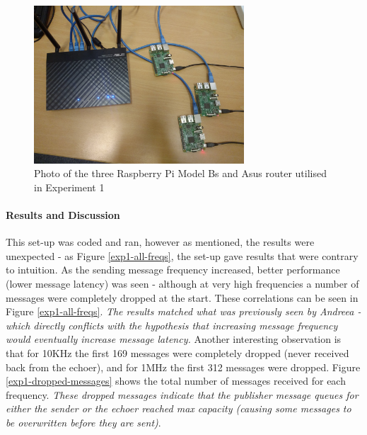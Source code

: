 \documentclass[../dissertation.tex]{subfiles}
\begin{document}
\begin{figure}[H]
\centering
\includegraphics[width=0.7\textwidth]{images/experiment1/bare-pis.jpg}
\caption{Photo of the three Raspberry Pi Model Bs and Asus router utilised in Experiment 1}
\end{figure}



\paragraph{Results and Discussion} This set-up was coded and ran, however as mentioned, the results were unexpected - as Figure \ref{exp1-all-freqs}, the set-up gave results that were contrary to intuition. As the sending message frequency increased, better performance (lower message latency) was seen - although at very high frequencies a number of messages were completely dropped at the start. These correlations can be seen in Figure \ref{exp1-all-freqs}. \textit{The results matched what was previously seen by Andreea - which directly conflicts with the hypothesis that increasing message frequency would eventually increase message latency.} Another interesting observation is that for 10KHz the first 169 messages were completely dropped (never received back from the echoer), and for 1MHz the first 312 messages were dropped. Figure \ref{exp1-dropped-messages} shows the total number of messages received for each frequency. \textit{These dropped messages indicate that the publisher message queues for either the sender or the echoer reached max capacity (causing some messages to be overwritten before they are sent)}.
\end{document}
